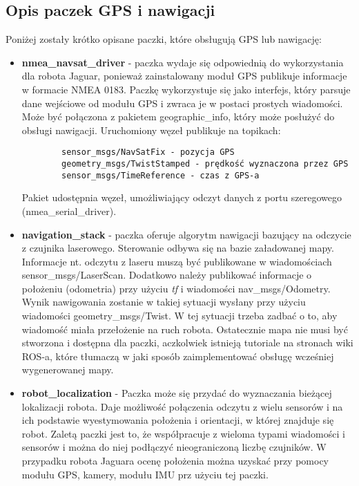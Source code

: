 \subsection{Opis paczek GPS i nawigacji}
Poniżej zostały krótko opisane paczki, które obsługują GPS lub nawigację:
\begin{itemize}
\item \textbf{nmea\_navsat\_driver} - paczka wydaje się odpowiednią do wykorzystania dla robota Jaguar, ponieważ zainstalowany moduł GPS publikuje informacje w formacie NMEA 0183. Paczkę wykorzystuje się jako interfejs, który parsuje dane wejściowe od modułu GPS i zwraca je w postaci prostych wiadomości. Może być połączona z pakietem geographic\_info, który może posłużyć do obsługi nawigacji. \newpage Uruchomiony węzeł publikuje na topikach:
	\begin{verbatim}
		sensor_msgs/NavSatFix - pozycja GPS
		geometry_msgs/TwistStamped - prędkość wyznaczona przez GPS
		sensor_msgs/TimeReference - czas z GPS-a
	\end{verbatim}
Pakiet udostępnia węzeł, umożliwiający odczyt danych z portu szeregowego (nmea\_serial\_driver).

\item \textbf{navigation\_stack} - paczka oferuje algorytm nawigacji bazujący na odczycie z czujnika laserowego. Sterowanie odbywa się na bazie załadowanej mapy. Informacje nt. odczytu z laseru muszą być publikowane w wiadomościach sensor\_msgs/LaserScan. Dodatkowo należy publikować informacje o położeniu (odometria) przy użyciu \textit{tf} i wiadomości nav\_msgs/Odometry. Wynik nawigowania zostanie w takiej sytuacji wysłany przy użyciu wiadomości geometry\_msgs/Twist. W tej sytuacji trzeba zadbać o to, aby wiadomość miała przełożenie na ruch robota. Ostatecznie mapa nie musi być stworzona i dostępna dla paczki, aczkolwiek istnieją tutoriale na stronach wiki ROS-a, które tłumaczą w jaki sposób zaimplementować obsługę wcześniej wygenerowanej mapy.   
\item \textbf{robot\_localization} - Paczka może się przydać do wyznaczania bieżącej lokalizacji robota. Daje możliwość połączenia odczytu z wielu sensorów i na ich podstawie wyestymowania położenia i orientacji, w której znajduje się robot. Zaletą paczki jest to, że współpracuje z wieloma typami wiadomości i sensorów i można do niej podłączyć nieograniczoną liczbę czujników. W przypadku robota Jaguara ocenę położenia można uzyskać przy pomocy modułu GPS, kamery, modułu IMU prz użyciu tej paczki. 
\end{itemize}
